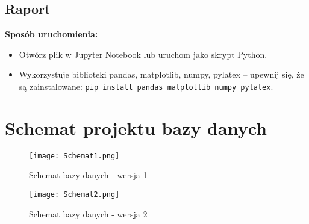 \documentclass{article}
\theoremstyle{definition}
\begin{document}
	\subsection{Raport}
	\textbf{Sposób uruchomienia:}
	\begin{itemize}
		\item Otwórz plik w Jupyter Notebook lub uruchom jako skrypt Python.
		\item Wykorzystuje biblioteki pandas, matplotlib, numpy, pylatex – upewnij się, że są zainstalowane: \texttt{pip install pandas matplotlib numpy pylatex}.
	\end{itemize}
	
	\section{Schemat projektu bazy danych}
		\begin{figure}[H]    
		\centering
		\texttt{[image: Schemat1.png]} 
		\caption{Schemat bazy danych - wersja 1}
	\end{figure}
	
	\begin{figure}[H]    
		\centering
		\texttt{[image: Schemat2.png]} 
		\caption{Schemat bazy danych - wersja 2}
	\end{figure}
	
	
\end{document}
